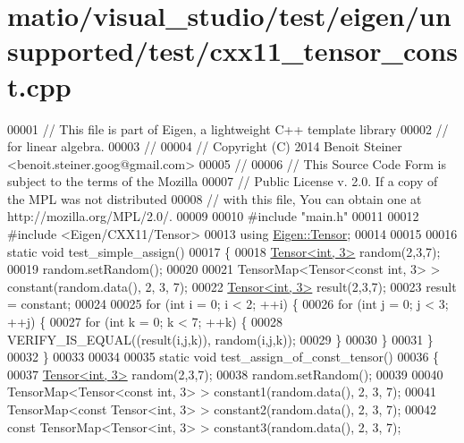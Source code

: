 \hypertarget{matio_2visual__studio_2test_2eigen_2unsupported_2test_2cxx11__tensor__const_8cpp_source}{}\section{matio/visual\+\_\+studio/test/eigen/unsupported/test/cxx11\+\_\+tensor\+\_\+const.cpp}
\label{matio_2visual__studio_2test_2eigen_2unsupported_2test_2cxx11__tensor__const_8cpp_source}

\begin{DoxyCode}
00001 \textcolor{comment}{// This file is part of Eigen, a lightweight C++ template library}
00002 \textcolor{comment}{// for linear algebra.}
00003 \textcolor{comment}{//}
00004 \textcolor{comment}{// Copyright (C) 2014 Benoit Steiner <benoit.steiner.goog@gmail.com>}
00005 \textcolor{comment}{//}
00006 \textcolor{comment}{// This Source Code Form is subject to the terms of the Mozilla}
00007 \textcolor{comment}{// Public License v. 2.0. If a copy of the MPL was not distributed}
00008 \textcolor{comment}{// with this file, You can obtain one at http://mozilla.org/MPL/2.0/.}
00009 
00010 \textcolor{preprocessor}{#include "main.h"}
00011 
00012 \textcolor{preprocessor}{#include <Eigen/CXX11/Tensor>}
00013 \textcolor{keyword}{using} \hyperlink{class_eigen_1_1_tensor}{Eigen::Tensor};
00014 
00015 
00016 \textcolor{keyword}{static} \textcolor{keywordtype}{void} test\_simple\_assign()
00017 \{
00018   \hyperlink{class_eigen_1_1_tensor}{Tensor<int, 3>} random(2,3,7);
00019   random.setRandom();
00020 
00021   TensorMap<Tensor<const int, 3> > constant(random.data(), 2, 3, 7);
00022   \hyperlink{class_eigen_1_1_tensor}{Tensor<int, 3>} result(2,3,7);
00023   result = constant;
00024 
00025   \textcolor{keywordflow}{for} (\textcolor{keywordtype}{int} i = 0; i < 2; ++i) \{
00026     \textcolor{keywordflow}{for} (\textcolor{keywordtype}{int} j = 0; j < 3; ++j) \{
00027       \textcolor{keywordflow}{for} (\textcolor{keywordtype}{int} k = 0; k < 7; ++k) \{
00028         VERIFY\_IS\_EQUAL((result(i,j,k)), random(i,j,k));
00029       \}
00030     \}
00031   \}
00032 \}
00033 
00034 
00035 \textcolor{keyword}{static} \textcolor{keywordtype}{void} test\_assign\_of\_const\_tensor()
00036 \{
00037   \hyperlink{class_eigen_1_1_tensor}{Tensor<int, 3>} random(2,3,7);
00038   random.setRandom();
00039 
00040   TensorMap<Tensor<const int, 3> > constant1(random.data(), 2, 3, 7);
00041   TensorMap<const Tensor<int, 3> > constant2(random.data(), 2, 3, 7);
00042   \textcolor{keyword}{const} TensorMap<Tensor<int, 3> > constant3(random.data(), 2, 3, 7);

\end{DoxyCode}

